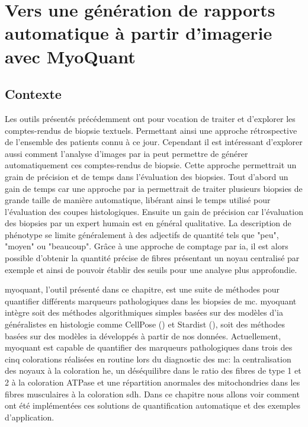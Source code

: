 \chapter{Vers une génération de rapports automatique à partir d’imagerie avec MyoQuant}
\section{Contexte}
Les outils présentés précédemment ont pour vocation de traiter et d'explorer les comptes-rendus de biopsie textuels. Permettant ainsi une approche rétrospective de l'ensemble des patients connu à ce jour. Cependant il est intéressant d'explorer aussi comment l'analyse d'images par \gls{ia} peut permettre de générer automatiquement ces comptes-rendus de biopsie. Cette approche permettrait un grain de précision et de temps dans l'évaluation des biopsies. Tout d'abord un gain de temps car une approche par \gls{ia} permettrait de traiter  plusieurs biopsies de grande taille de manière automatique, libérant ainsi le temps utilisé pour l'évaluation des coupes histologiques. Ensuite un gain de précision car l'évaluation des biopsies par un expert humain est en général qualitative. La description de phénotype se limite généralement à des adjectifs de quantité tels que "peu", "moyen" ou "beaucoup". Grâce à une approche de comptage par \gls{ia}, il est alors possible d'obtenir la quantité précise de fibres présentant un noyau centralisé par exemple et ainsi de pouvoir établir des seuils pour une analyse plus approfondie.

\gls{myoquant}, l'outil présenté dans ce chapitre, est une suite de méthodes pour quantifier différents marqueurs pathologiques dans les biopsies de \gls{mc}. \gls{myoquant} intègre soit des méthodes algorithmiques simples basées sur des modèles d'\gls{ia} généralistes en histologie comme CellPose (\cite{stringer_cellpose_2021}) et Stardist (\cite{weigert_star-convex_2020}), soit des méthodes basées sur des modèles \gls{ia} développés à partir de nos données. Actuellement, \gls{myoquant} est capable de quantifier des marqueurs pathologiques dans trois des cinq colorations réalisées en routine lors du diagnostic des \gls{mc}: la centralisation des noyaux à la coloration \gls{he}, un déséquilibre dans le ratio des fibres de type 1 et 2 à la coloration ATPase et une répartition anormales des mitochondries dans les fibres musculaires à la coloration \gls{sdh}. Dans ce chapitre nous allons voir comment ont été implémentées ces solutions de quantification automatique et des exemples d'application.

